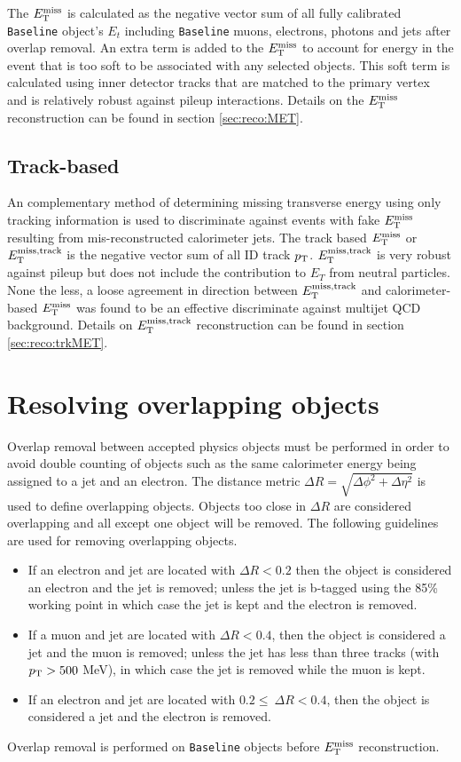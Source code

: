 \indent The $E_{\mathrm{T}}^{\mathrm{miss}}$ is calculated as the negative vector sum of all fully calibrated {\tt Baseline} object's $E_t$ including {\tt Baseline} muons, electrons, photons and jets after overlap removal.   An extra term is added to the $E_{\mathrm{T}}^{\mathrm{miss}}$ to account for energy in the event that is too soft to be associated with any selected objects. This soft term is calculated using inner detector tracks that are matched to the primary vertex and is relatively robust against pileup interactions.  Details on the $E_{\mathrm{T}}^{\mathrm{miss}}$ reconstruction can be found in section \ref{sec:reco:MET}. \\ 

\subsection{\boldmath Track-based \MET}

\indent An complementary method of determining missing transverse energy using only tracking information is used to discriminate against events with fake $E_{\mathrm{T}}^{\mathrm{miss}}$ resulting from mis-reconstructed calorimeter jets.  The track based $E_{\mathrm{T}}^{\mathrm{miss}}$ or $E_{\mathrm{T}}^{\mathrm{miss, track}}$ is the negative vector sum of all ID track $p_{\mathrm{T}}$.  $E_{\mathrm{T}}^{\mathrm{miss, track}}$ is very robust against pileup but does not include the contribution to $E_T$ from neutral particles.  None the less, a loose agreement in direction between $E_{\mathrm{T}}^{\mathrm{miss, track}}$ and calorimeter-based $E_{\mathrm{T}}^{\mathrm{miss}}$ was found to be an effective discriminate against multijet QCD background.  Details on $E_{\mathrm{T}}^{\mathrm{miss, track}}$ reconstruction can be found in section \ref{sec:reco:trkMET}. \\

\section{Resolving overlapping objects}
\label{sec:Selection_overlap}

\indent Overlap removal between accepted physics objects must be performed in order to avoid double counting of objects such as the same calorimeter energy being assigned to a jet and an electron.  The distance metric  $\Delta R = \sqrt{\Delta \phi^2 + \Delta \eta^2}$ is used to define overlapping objects.  Objects too close in $\Delta R$ are considered overlapping and all except one object will be removed.  The following guidelines are used for removing overlapping objects. \\

\begin{itemize}
\item If an electron and jet are located with $\Delta R < 0.2$ then the object is considered an electron and  the jet is removed; unless the jet is b-tagged using the 85\% working point in which case the jet is kept and the electron is removed. 
\item If a muon and jet are located with $\Delta R < 0.4$, then the object is considered a jet and the muon is removed; unless the jet has less than three tracks (with $p_{\mathrm{T}}>500$ MeV), in which case the jet is removed while the muon is kept. 
\item If an electron and jet are located with $0.2 \leq\ \Delta R < 0.4$, then the object is considered a jet and the electron is removed.
\end{itemize}

\indent Overlap removal is performed on {\tt Baseline} objects before $E_{\mathrm{T}}^{\mathrm{miss}}$ reconstruction. \\


